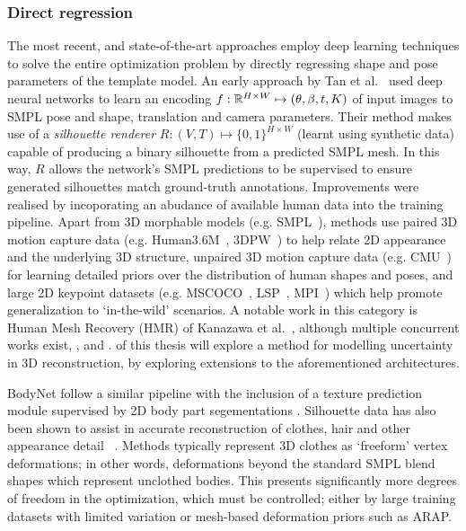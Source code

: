     \subsubsection{Direct regression}
    The most recent, and state-of-the-art approaches employ deep learning techniques to solve the entire optimization problem by directly regressing shape and pose parameters of the template model. An early approach by Tan et al.~\cite{tan17indirect} used deep neural networks to learn an encoding $f: {\mathbb{R}^{H \times W}} \mapsto (\theta, \beta, t, K)$ of input images to SMPL pose and shape, translation and camera parameters. Their method makes use of a \emph{silhouette renderer} $R : (V, T) \mapsto \{0,1\}^{H \times W}$ (learnt using synthetic data) capable of producing a binary silhouette from a predicted SMPL mesh. In this way, $R$ allows the network's SMPL predictions to be supervised to ensure generated silhouettes match ground-truth annotations. 
    Improvements were realised by incoporating an abudance of available human data into the training pipeline. Apart from 3D morphable models (e.g. SMPL~\cite{loper15smpl}), methods use paired 3D motion capture data (e.g. Human3.6M~\cite{ionescu2013human3,IonescuSminchisescu11}, 3DPW~\cite{vonmarcard2018recovering}) to help relate 2D appearance and the underlying 3D structure, unpaired 3D motion capture data (e.g. CMU~) for learning detailed priors over the distribution of human shapes and poses, and large 2D keypoint datasets (e.g. MSCOCO~, LSP~, MPI~) which help promote generalization to `in-the-wild' scenarios. A notable work in this category is Human Mesh Recovery (HMR) of Kanazawa et al.~\cite{kanazawa18end-to-end}, although multiple concurrent works exist, ,  and .  of this thesis will explore a method for modelling uncertainty in 3D reconstruction, by exploring extensions to the aforementioned architectures.

    
    BodyNet  follow a similar pipeline with the inclusion of a texture prediction module supervised by 2D body part segementations . Silhouette data has also been shown to assist in accurate reconstruction of clothes, hair and other appearance detail~\cite{alldieck2019learning}  . Methods typically represent 3D clothes as `freeform' vertex deformations; in other words, deformations beyond the standard SMPL blend shapes which represent unclothed bodies. This presents significantly more degrees of freedom in the optimization, which must be controlled; either by large training datasets with limited variation or mesh-based deformation priors such as ARAP. 

